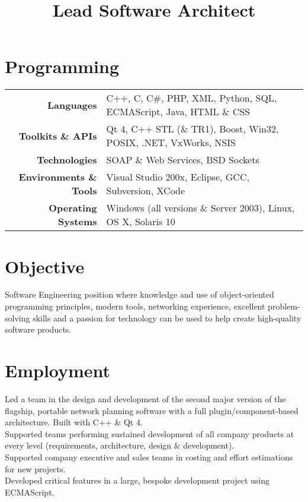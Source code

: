 \documentclass{resume}
\begin{document}
\address{22 Morse Close\\Chippenham\\SN15 3FY\\UK}
\address{lee@leegent.net\\+44 7748 183797}

\begin{resume}

\section{Programming} 
\begin{tabular}{rl}
\textbf{Languages} & C++, C, C\#, PHP, XML, Python, SQL, ECMAScript, Java, HTML \& CSS \\
\textbf{Toolkits \& APIs} & Qt 4, C++ STL (\& TR1), Boost, Win32, POSIX, .NET, VxWorks, NSIS \\
\textbf{Technologies} & SOAP \& Web Services, BSD Sockets \\
\textbf{Environments \& Tools} & Visual Studio 200x, Eclipse, GCC, Subversion, XCode \\
\textbf{Operating Systems} & Windows (all versions \& Server 2003), Linux, OS X, Solaris 10
\end{tabular}

\section{Objective}
Software Engineering position where knowledge and use of object-oriented programming principles, modern tools, networking experience, excellent problem-solving skills and a passion for technology can be used to help create high-quality software products.

\section{Employment}

\title{\bf{Lead Software Architect}}
\begin{position}
Led a team in the design and development of the second major version of the flagship, portable network planning software with a full plugin/component-based architecture.  Built with C++ \& Qt 4.\vspace{1mm}\\
Supported teams performing sustained development of all company products at every level (requirements, architecture, design \& development).\vspace{1mm}\\
Supported company executive and sales teams in costing and effort estimations for new projects.\vspace{1mm}\\
Developed critical features in a large, bespoke development project using ECMAScript.
\end{position}


\end{resume}
\end{document}
